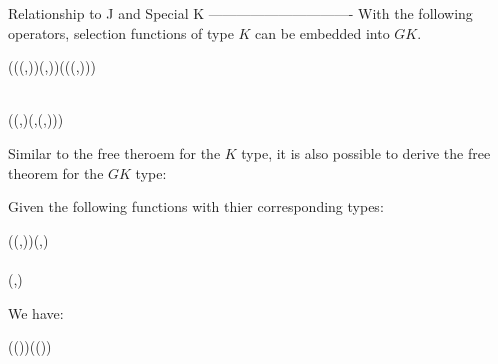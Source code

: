Relationship to J and Special K
-------------------------------
With the following operators, selection functions of type $K$ can be embedded into $GK$.

\begin{hscode}\SaveRestoreHook
{}%
%
%
\>[3]{}\mathbin{::}\;\;\;\mathbin{\circ}((\to (,))\to (,))\to ((\to (,))\to {}){}\<[E]%
\\
\>[3]{}\;\mathrel{=}\mathbin{\circ}\<[E]%
\ColumnHook
\end{hscode}\resethooks
\begin{hscode}\SaveRestoreHook
{}%
%
%
\>[3]{}\mathbin{::}\;\;\to {}\;\;\<[E]%
\\
\>[3]{}\;\;\mathrel{=}\;(\lambda {}\to {}\;(,)\mathrel{=}\;\;\;(,(,))){}\<[E]%
\ColumnHook
\end{hscode}\resethooks
Similar to the free theroem for the $K$ type, it is also possible to derive the free 
theorem for the $GK$ type:

\begin{theorem}
Given the following functions with thier corresponding types:

\begin{hscode}\SaveRestoreHook
{}%
%
\>[B]{}\mathbin{::}\;\mathbin{\circ}(\lambda {}\to (,))\to (,){}\<[E]%
\\
\>[B]{}\mathbin{::}\to {}\<[E]%
\\
\>[B]{}\mathbin{::}\to (,){}\<[E]%
\ColumnHook
\end{hscode}\resethooks

We have:

\begin{hscode}\SaveRestoreHook
{}%
%
\>[B]{}((\mathbin{***})\mathbin{\circ})\;\mathrel{=}\;((\mathbin{***})\mathbin{\circ}){}\<[E]%
\ColumnHook
\end{hscode}\resethooks

\end{theorem}

